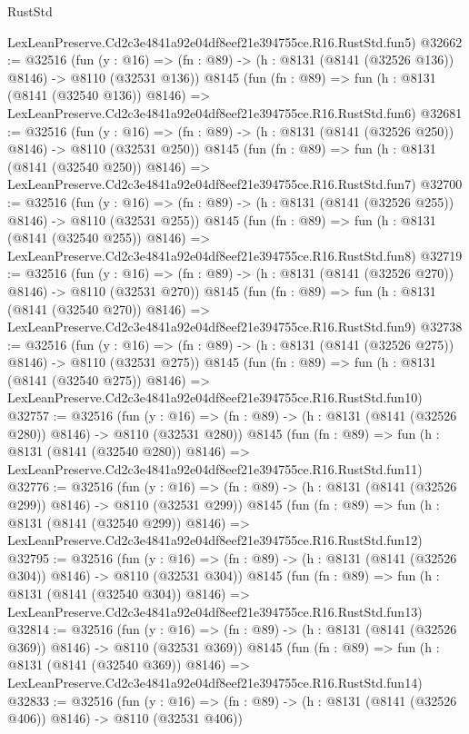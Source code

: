 \begin{lexlean}{RustStd}
\begin{coremodule}
    LexLeanPreserve.Cd2c3e4841a92e04df8eef21e394755ce.R16.RustStd.fun5)
@32662 := @32516
    (fun (y : @16) => (fn : @89) -> (h : @8131 (@8141 (@32526 @136)) @8146) -> @8110 (@32531 @136))
    @8145
    (fun (fn : @89) =>
    fun (h : @8131 (@8141 (@32540 @136)) @8146) =>
    LexLeanPreserve.Cd2c3e4841a92e04df8eef21e394755ce.R16.RustStd.fun6)
@32681 := @32516
    (fun (y : @16) => (fn : @89) -> (h : @8131 (@8141 (@32526 @250)) @8146) -> @8110 (@32531 @250))
    @8145
    (fun (fn : @89) =>
    fun (h : @8131 (@8141 (@32540 @250)) @8146) =>
    LexLeanPreserve.Cd2c3e4841a92e04df8eef21e394755ce.R16.RustStd.fun7)
@32700 := @32516
    (fun (y : @16) => (fn : @89) -> (h : @8131 (@8141 (@32526 @255)) @8146) -> @8110 (@32531 @255))
    @8145
    (fun (fn : @89) =>
    fun (h : @8131 (@8141 (@32540 @255)) @8146) =>
    LexLeanPreserve.Cd2c3e4841a92e04df8eef21e394755ce.R16.RustStd.fun8)
@32719 := @32516
    (fun (y : @16) => (fn : @89) -> (h : @8131 (@8141 (@32526 @270)) @8146) -> @8110 (@32531 @270))
    @8145
    (fun (fn : @89) =>
    fun (h : @8131 (@8141 (@32540 @270)) @8146) =>
    LexLeanPreserve.Cd2c3e4841a92e04df8eef21e394755ce.R16.RustStd.fun9)
@32738 := @32516
    (fun (y : @16) => (fn : @89) -> (h : @8131 (@8141 (@32526 @275)) @8146) -> @8110 (@32531 @275))
    @8145
    (fun (fn : @89) =>
    fun (h : @8131 (@8141 (@32540 @275)) @8146) =>
    LexLeanPreserve.Cd2c3e4841a92e04df8eef21e394755ce.R16.RustStd.fun10)
@32757 := @32516
    (fun (y : @16) => (fn : @89) -> (h : @8131 (@8141 (@32526 @280)) @8146) -> @8110 (@32531 @280))
    @8145
    (fun (fn : @89) =>
    fun (h : @8131 (@8141 (@32540 @280)) @8146) =>
    LexLeanPreserve.Cd2c3e4841a92e04df8eef21e394755ce.R16.RustStd.fun11)
@32776 := @32516
    (fun (y : @16) => (fn : @89) -> (h : @8131 (@8141 (@32526 @299)) @8146) -> @8110 (@32531 @299))
    @8145
    (fun (fn : @89) =>
    fun (h : @8131 (@8141 (@32540 @299)) @8146) =>
    LexLeanPreserve.Cd2c3e4841a92e04df8eef21e394755ce.R16.RustStd.fun12)
@32795 := @32516
    (fun (y : @16) => (fn : @89) -> (h : @8131 (@8141 (@32526 @304)) @8146) -> @8110 (@32531 @304))
    @8145
    (fun (fn : @89) =>
    fun (h : @8131 (@8141 (@32540 @304)) @8146) =>
    LexLeanPreserve.Cd2c3e4841a92e04df8eef21e394755ce.R16.RustStd.fun13)
@32814 := @32516
    (fun (y : @16) => (fn : @89) -> (h : @8131 (@8141 (@32526 @369)) @8146) -> @8110 (@32531 @369))
    @8145
    (fun (fn : @89) =>
    fun (h : @8131 (@8141 (@32540 @369)) @8146) =>
    LexLeanPreserve.Cd2c3e4841a92e04df8eef21e394755ce.R16.RustStd.fun14)
@32833 := @32516
    (fun (y : @16) => (fn : @89) -> (h : @8131 (@8141 (@32526 @406)) @8146) -> @8110 (@32531 @406))

\end{coremodule}
\end{lexlean}
